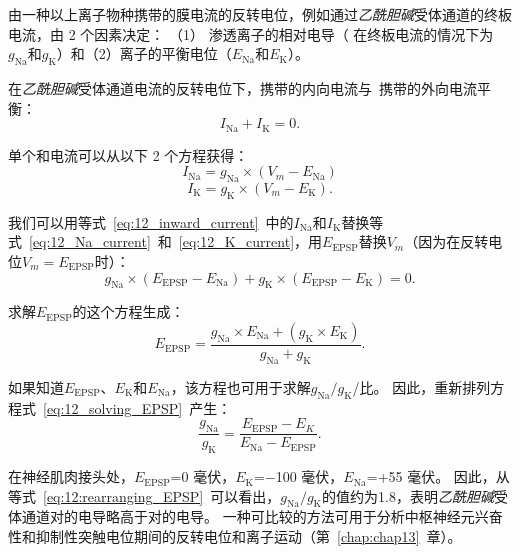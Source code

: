 \begin{proposition}[终板电位的反转电位] \label{box:12_1}
	
	\quad \quad 由一种以上离子物种携带的膜电流的反转电位，例如通过\textit{乙酰胆碱}受体通道的终板电流，由 2 个因素决定：
	（1） 渗透离子的相对电导（ 在终板电流的情况下为$g_\text{Na}$和$g_\text{K}$）和（2）离子的平衡电位（$E_\text{Na}$和$E_\text{K}$）。
	
	\quad \quad 在\textit{乙酰胆碱}受体通道电流的反转电位下，携带的内向电流与~携带的外向电流平衡：
	\begin{equation}\label{eq:12_inward_current}
		I_\text{Na} + I_\text{K} = 0.
	\end{equation}
	
	\quad \quad 单个和电流可以从以下 2 个方程获得：
	\begin{equation}\label{eq:12_Na_current}
		I_\text{Na} = g_\text{Na} \times (V_m - E_\text{Na})
	\end{equation}
	\begin{equation}\label{eq:12_K_current}
		I_\text{K} = g_\text{K} \times (V_m - E_\text{K}).
	\end{equation}
	
	\quad \quad 我们可以用等式~\ref{eq:12_inward_current}~中的$ I_\text{Na} $和$ I_\text{K} $替换等式~\ref{eq:12_Na_current}~和~\ref{eq:12_K_current}，用$E_{\text{EPSP}}$替换$V_m$（因为在反转电位$V_m = E_{\text{EPSP}}$时）：
	\begin{equation}\label{eq:12_substitude_inward_current}
		g_\text{Na} \times (E_{\text{EPSP}} - E_\text{Na}) + 
		g_\text{K} \times (E_{\text{EPSP}} - E_\text{K})
		= 0.
	\end{equation}
	
	\quad \quad 求解$ E_{\text{EPSP}} $的这个方程生成：
	\begin{equation}\label{eq:12_solving_EPSP}
		E_{\text{EPSP}} = 
			\frac{
				g_\text{Na} \times E_\text{Na} + (g_\text{K} \times E_\text{K})
			}
			{
				g_\text{Na} + g_\text{K}
			}.
	\end{equation}
	
	\quad \quad 如果知道$E_{\text{EPSP}}$、$E_\text{K}$和$E_\text{Na}$，该方程也可用于求解$g_\text{Na} / g_\text{K}$/比。
	因此，重新排列方程式~\ref{eq:12_solving_EPSP}~产生：
	\begin{equation}\label{eq:12:rearranging_EPSP}
		\frac{g_\text{Na}}{g_\text{K}} = 
		\frac{E_{\text{EPSP}} - E_{K}}{E_\text{Na} - E_{\text{EPSP}}}.
	\end{equation}
	
	\quad \quad 在神经肌肉接头处，$E_{\text{EPSP}}$=0 毫伏，$E_\text{K}$=−100 毫伏，$E_\text{Na}$=+55 毫伏。
	因此，从等式~\ref{eq:12:rearranging_EPSP}~可以看出，$g_\text{Na} / g_\text{K}$的值约为1.8，表明\textit{乙酰胆碱}受体通道对的电导略高于对的电导。
	一种可比较的方法可用于分析中枢神经元兴奋性和抑制性突触电位期间的反转电位和离子运动（第~\ref{chap:chap13}~章）。
	
\end{proposition}



